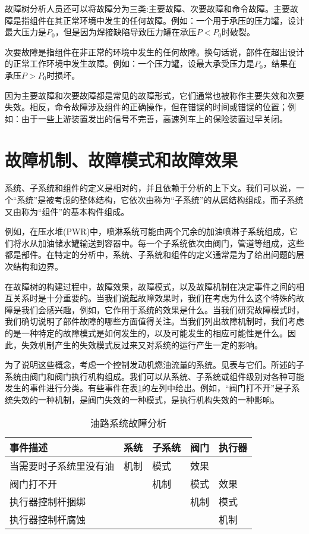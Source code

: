 \documentclass[cn,11pt,chinese]{elegantbook}
\begin{document}
故障树分析人员还可以将故障分为三类:主要故障、次要故障和命令故障。主要故障是指组件在其正常环境中发生的任何故障。例如：一个用于承压的压力罐，设计最大压力是$P_0$，但是因为焊接缺陷导致压力罐在承压$P<P_0$时破裂。

次要故障是指组件在非正常的环境中发生的任何故障。换句话说，部件在超出设计的正常工作环境中发生故障。例如：一个压力罐，设最大承受压力是$P_0$，结果在承压$P>P_0$时损坏。

因为主要故障和次要故障都是常见的故障形式，它们通常也被称作主要失效和次要失效。相反，命令故障涉及组件的正确操作，但在错误的时间或错误的位置；例如：由于一些上游装置发出的信号不完善，高速列车上的保险装置过早关闭。

\section{故障机制、故障模式和故障效果}

系统、子系统和组件的定义是相对的，并且依赖于分析的上下文。我们可以说，一个“系统”是被考虑的整体结构，它依次由称为“子系统”的从属结构组成，而子系统又由称为“组件”的基本构件组成。

例如，在压水堆(PWR)中，喷淋系统可能由两个冗余的加油喷淋子系统组成，它们将水从加油储水罐输送到容器中。每一个子系统依次由阀门，管道等组成，这些都是部件。在特定的分析中，系统、子系统和组件的定义通常是为了给出问题的层次结构和边界。

在故障树的构建过程中，故障效果，故障模式，以及故障机制在决定事件之间的相互关系时是十分重要的。当我们说起故障效果时，我们在考虑为什么这个特殊的故障是我们会感兴趣，例如，它作用于系统的效果是什么。当我们研究故障模式时，我们确切说明了部件故障的哪些方面值得关注。当我们列出故障机制时，我们考虑的是一种特定的故障模式是如何发生的，以及可能发生的相应可能性是什么。因此，失效机制产生的失效模式反过来又对系统的运行产生一定的影响。

为了说明这些概念，考虑一个控制发动机燃油流量的系统。见表与它们。所述的子系统由阀门和阀门执行机构组成。我们可以从系统、子系统或组件级别对各种可能发生的事件进行分类。有些事件在表\ref{tab:tab5_1}的左列中给出。例如，“阀门打不开”是子系统失效的一种机制，是阀门失效的一种模式，是执行机构失效的一种影响。

\begin{table}[htpb]
	\centering
	\caption{油路系统故障分析}
	\label{tab:tab5_1}
	\begin{tabular}{@{}lllll@{}}
		\toprule
		事件描述        & 系统 & 子系统 & 阀门 & 执行器 \\ \midrule
		当需要时子系统里没有油 & 机制 & 模式  & 效果 &     \\
		阀门打不开       &    & 机制  & 模式 & 效果  \\
		执行器控制杆捆绑    &    &     & 机制 & 模式  \\
		执行器控制杆腐蚀    &    &     &    & 机制  \\ \bottomrule
	\end{tabular}
\end{table}
\end{document}
